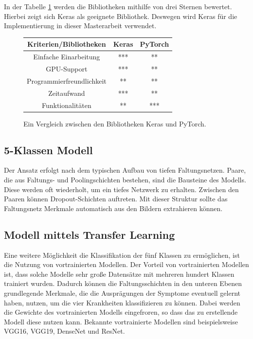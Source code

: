 In der Tabelle \ref{bib_comp} werden die Bibliotheken mithilfe von drei Sternen bewertet. Hierbei zeigt sich Keras als geeignete Bibliothek. Deswegen wird Keras für die Implementierung in dieser Masterarbeit verwendet.
~\newline
\begin{figure}[h]
\center
\begin{tabular}{|c|c|c|}
	\hline
	Kriterien/Bibliotheken & Keras & PyTorch \\
	\hline
	Einfache Einarbeitung & *** & ** \\
	\hline
	GPU-Support  & *** & ** \\
	\hline
	Programmierfreundlichkeit  & ** & ** \\
	\hline
	Zeitaufwand  & *** & ** \\
	\hline
	Funktionalitäten  & ** & *** \\
	\hline
\end{tabular}
\caption{Ein Vergleich zwischen den Bibliotheken Keras und PyTorch.}
\label{bib_comp}
\end{figure}



\newpage
\subsection{5-Klassen Modell}

Der Ansatz erfolgt nach dem typischen Aufbau von tiefen Faltungsnetzen. Paare, die aus Faltungs- und Poolingschichten bestehen, sind die Bausteine des Modells. Diese werden oft wiederholt, um ein tiefes Netzwerk zu erhalten. Zwischen den Paaren können Dropout-Schichten auftreten. Mit dieser Struktur sollte das Faltungsnetz Merkmale automatisch aus den Bildern extrahieren können.

\subsection{Modell mittels Transfer Learning}
Eine weitere Möglichkeit die Klassifikation der fünf Klassen zu ermöglichen, ist die Nutzung von vortrainierten Modellen. Der Vorteil von vortrainierten Modellen ist, dass solche Modelle sehr große Datensätze mit mehreren hundert Klassen trainiert wurden. Dadurch können die Faltungsschichten in den unteren Ebenen grundlegende Merkmale, die die Ausprägungen der Symptome eventuell gelernt haben, nutzen, um die vier Krankheiten klassifizieren zu können. Dabei werden die Gewichte des vortrainierten Modells eingefroren, so dass das zu erstellende Modell diese nutzen kann.  
Bekannte vortrainierte Modellen sind beispielsweise VGG16, VGG19, DenseNet und ResNet. 


